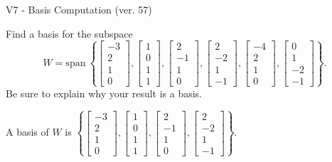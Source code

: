 \begin{exercise}
  \begin{exerciseTitle}V7 - Basis Computation (ver. 57)\end{exerciseTitle}
  \begin{exerciseStatement}
    Find a basis for the subspace 
\[W=\mathrm{span}\ \left\{\left[\begin{array}{r}
-3 \\
2 \\
1 \\
0
\end{array}\right] , \left[\begin{array}{r}
1 \\
0 \\
1 \\
1
\end{array}\right] , \left[\begin{array}{r}
2 \\
-1 \\
1 \\
0
\end{array}\right] , \left[\begin{array}{r}
2 \\
-2 \\
1 \\
-1
\end{array}\right] , \left[\begin{array}{r}
-4 \\
2 \\
1 \\
0
\end{array}\right] , \left[\begin{array}{r}
0 \\
1 \\
-2 \\
-1
\end{array}\right]\right\}.\]
 Be sure to explain why your result is a basis.


  \end{exerciseStatement}
  \begin{exerciseAnswer}
   A basis of \(W\) is  \(\left\{\left[\begin{array}{r}
-3 \\
2 \\
1 \\
0
\end{array}\right] , \left[\begin{array}{r}
1 \\
0 \\
1 \\
1
\end{array}\right] , \left[\begin{array}{r}
2 \\
-1 \\
1 \\
0
\end{array}\right] , \left[\begin{array}{r}
2 \\
-2 \\
1 \\
-1
\end{array}\right]\right\}\).
  


  \end{exerciseAnswer}
\end{exercise}
